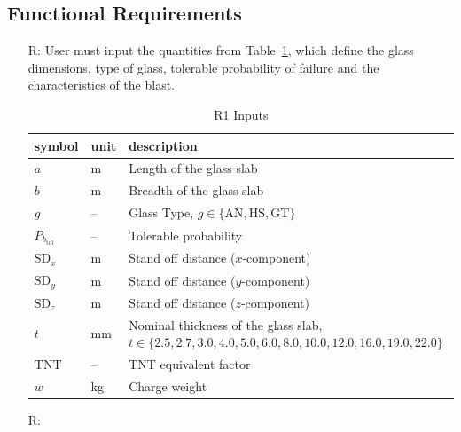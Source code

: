 \documentclass[12pt]{article}
\newcounter{reqnum} %
\begin{document}
\subsection{Functional Requirements} \label{Func}

\noindent \begin{itemize}

\item[R\refstepcounter{reqnum}\thereqnum \label{Input}:] User must input the quantities
  from Table~\ref{TblReqInput}, which define the glass dimensions, type of glass, tolerable probability of
  failure and the characteristics of the blast.

\renewcommand{\arraystretch}{1.2}

\begin{table}[!h]
\caption{R1 Inputs} 
\label{TblReqInput}
\renewcommand{\arraystretch}{1.2}
\begin{tabular}{l l p{11cm}} 
\toprule
\textbf{symbol} & \textbf{unit} & \textbf{description}\\
\midrule 
$a$ & \si{\metre}	& Length of the glass slab\\
$b$ & \si{\metre}	& Breadth of the glass slab\\
$g$ & -- & Glass Type, $g \in \{ \text{AN}, \text{HS}, \text{GT} \}$\\
$P_{b_{\text{tol}}}$ & -- & Tolerable probability\\
$\text{SD}_x$ & \si{\meter} & Stand off distance ($x$-component)\\
$\text{SD}_y$ & \si{\metre} & Stand off distance ($y$-component)\\
$\text{SD}_z$ & \si{\metre} & Stand off distance ($z$-component)\\
$t$ & \si{\milli\metre}	& Nominal thickness of the glass slab,\newline $t \in
                                  \{2.5, 2.7, 3.0, 4.0, 5.0, 6.0, 8.0, 10.0,
                                  12.0, 16.0, 19.0, 22.0\}$ \\
$\text{TNT}$ & -- & TNT equivalent factor\\
$w$ & \si{\kilo\gram}	& Charge weight\\
\bottomrule
\end{tabular}
\end{table}

\item [R\refstepcounter{reqnum}\thereqnum \label{KnownValues}:]


\end{itemize}
\end{document}
